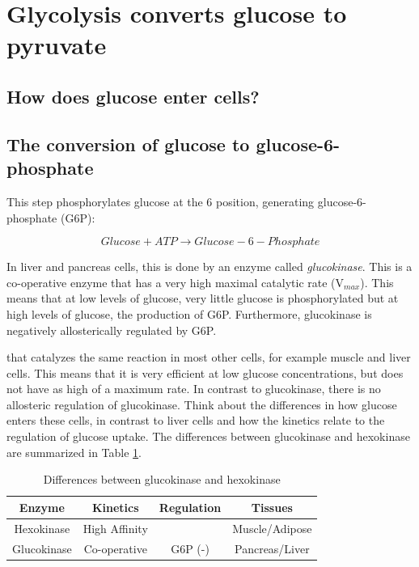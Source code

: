 \documentclass{tufte-handout}
\begin{document}
\pagebreak

\section{Glycolysis converts glucose to pyruvate}
\subsection{How does glucose enter cells?}
\subsection{The conversion of glucose to glucose-6-phosphate}

   This step phosphorylates glucose at the 6 position, generating glucose-6-phosphate (G6P):

\begin{equation}
Glucose + ATP \rightarrow Glucose-6-Phosphate
\end{equation}

In liver and pancreas cells, this is done by an enzyme called \emph{glucokinase}.  This is a co-operative enzyme that has a very high maximal catalytic rate (V$_{max}$).  This means that at low levels of glucose, very little glucose is phosphorylated but at high levels of glucose, the production of G6P.  Furthermore, glucokinase is negatively allosterically regulated by G6P.

 that catalyzes the same reaction in most other cells, for example muscle and liver cells.  This means that it is very efficient at low glucose concentrations, but does not have as high of a maximum rate.  In contrast to glucokinase, there is no allosteric regulation of glucokinase.  Think about the differences in how glucose enters these cells, in contrast to liver cells and how the kinetics relate to the regulation of glucose uptake.  The differences between glucokinase and hexokinase are summarized in Table \ref{tab:glucokinase}.

\begin{table}
\centering
\caption{Differences between glucokinase and hexokinase}
\label{tab:glucokinase}
\begin{tabular}{cccc}
\hline
\textbf {Enzyme} & \textbf{Kinetics}  & \textbf{Regulation}  & \textbf{Tissues}\\
\hline
Hexokinase & High Affinity & & Muscle/Adipose\\
Glucokinase & Co-operative & G6P (-) & Pancreas/Liver\\

\hline
\end{tabular}
\end{table}
\end{document}
